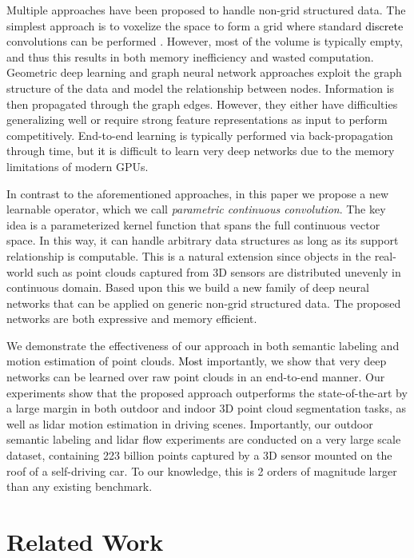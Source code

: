 \documentclass[10pt,twocolumn,letterpaper]{article}
\newcommand\simon[1]{\textcolor{black}{#1}}
\begin{document}
Multiple approaches have been proposed to handle non-grid structured data. The simplest approach is to voxelize the space to form  a grid where standard 
\simon{discrete} convolutions can be performed \cite{modelnet40, octnet}. However, most of the volume is typically empty, and thus this results in both  memory inefficiency and wasted computation.  Geometric deep learning \cite{geometric-deep-learning, gcn} and graph neural network approaches \cite{gnn, ggnn} exploit the graph structure of the data and model the relationship between nodes. 
Information is then propagated through the graph edges. However, they either have difficulties generalizing well or require strong feature representations as input to perform competitively. End-to-end learning is typically performed via back-propagation through time, but \simon{it} is difficult to learn very deep networks due to the memory limitations of modern GPUs. 




In contrast to the aforementioned approaches, in this paper we propose a new learnable operator, which we call {\it parametric continuous convolution}. The key idea is a parameterized kernel function that spans the full continuous vector space. 
In this way, it can handle arbitrary data structures as long as its support relationship is computable. This is a natural extension since objects in the real-world such as point clouds 
captured from 3D sensors are distributed unevenly in continuous domain. Based upon this we build a new family of deep neural networks that can be applied on generic non-grid structured data. The proposed networks are both expressive and memory efficient. 

We demonstrate the effectiveness of our approach in both semantic labeling and motion estimation of point clouds. \simon{Most} importantly,  we show that very deep networks can be learned over raw point clouds in an end-to-end manner. Our experiments show that the proposed approach outperforms the state-of-the-art by a large margin in both outdoor and indoor 3D point cloud segmentation tasks, as well as lidar motion estimation in driving scenes. 
Importantly, our  outdoor semantic labeling and lidar flow experiments are conducted on a very large scale dataset, containing 223 billion points captured by a  3D sensor mounted on the roof of  a self-driving car.
To our knowledge, this is 2 orders of magnitude larger than any existing benchmark. 

 
\section{Related Work}
\end{document}
